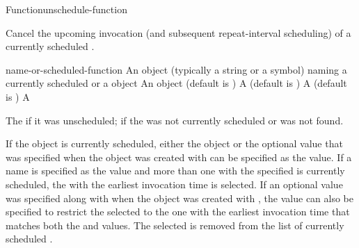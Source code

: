 \documentclass[10pt,twoside,english,pdftex]{article}
\begin{document}
\begin{functiondoc}{Function}{unschedule-function}%
  {
    }
%
%
%
%

\fnsyntax

\fnpurpose Cancel the upcoming invocation (and subsequent repeat-interval
scheduling) of a currently scheduled .

\fnpackage {}

\fnmodule {}

\fnargs
\begin{args}{name-or-scheduled-function}
 An object (typically a string or a
  symbol) naming a currently scheduled  or a
   object
\arg[marker] An object (default is \nil)
\arg[verbose] A  
  (default is )
\arg[warnp] A  (default is ) 
\arg[boolean] A 
\end{args}

\fnreturns The  if it was unscheduled; \nil{} if the 
 was not currently scheduled or was not found.

\fnerrors
\nothreads{}

\fndescription If the  object is currently
scheduled, either the  object or the optional
 value that was specified when the
 object was created with
 can be specified as the
 value.  If a name is specified as
the  value and more than one
 with the specified  is currently
scheduled, the  with the earliest invocation
time is selected.  If an optional  value was specified along
with  when the  object was created
with , the 
value can also be specified to restrict the selected
 to the one with the earliest invocation time
that matches both the  and  values.  The selected
 is removed from the list of currently
scheduled .


\end{functiondoc}
\end{document}
